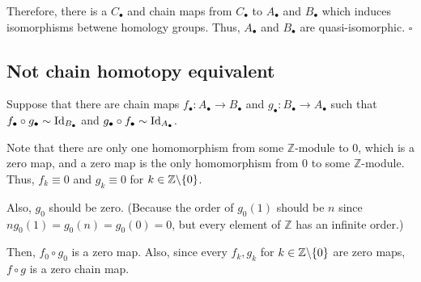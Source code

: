\documentclass{article}
\newcommand{\bs}{\char`\\}
\newcommand{\qedsq}{\hfill$\square$}
\newcommand{\bbZ}{\mathbb{Z}}
\newcommand{\Id}{\textnormal{Id}}
\begin{document}
Therefore, there is a \(C_\bullet\) and chain maps from \(C_\bullet\) to \(A_\bullet\) and \(B_\bullet\) which induces isomorphisms betwene homology groups.
Thus, \(A_\bullet\) and \(B_\bullet\) are quasi-isomorphic.
\qedsq

\subsection*{Not chain homotopy equivalent}

Suppose that there are chain maps \(f_\bullet: A_\bullet \to B_\bullet\) and \(g_\bullet: B_\bullet \to A_\bullet\) such that \(f_\bullet \circ g_\bullet \sim \Id_{B_\bullet}\) and \(g_\bullet \circ f_\bullet \sim \Id_{A_\bullet}\).


Note that there are only one homomorphism from some \(\bbZ\)-module to \(0\), which is a zero map, and a zero map is the only homomorphism from \(0\) to some \(\bbZ\)-module. Thus, \(f_k \equiv 0\) and \(g_k \equiv 0\) for \(k \in \bbZ \bs \{0\}\).

Also, \(g_0\) should be zero.
(Because the order of \(g_0(1)\) should be \(n\) since \(n g_0(1) = g_0(n) = g_0(0) = 0\), but every element of \(\bbZ\) has an infinite order.)

Then, \(f_0 \circ g_0\) is a zero map. Also, since every \(f_k, g_k\) for \(k \in \bbZ \bs \{0\}\) are zero maps, \(f \circ g\) is a zero chain map.
\end{document}
